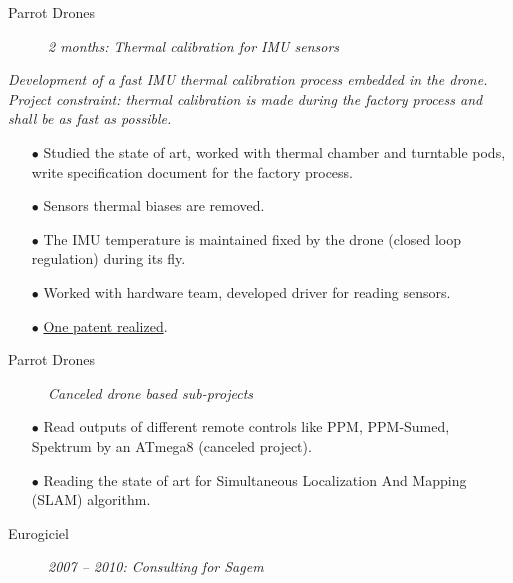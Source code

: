 \documentclass{crcv}
\newcommand{\desc}[4]{
\begin{description}
\item[\textcolor{fortitle}{#1}]\hspace*{\fill}\textit{\textcolor{fortitle}{#2 -- #3: #4}}\\
\end{description}
}
\newcommand{\descC}[3]{
\begin{description}
\item[\textcolor{fortitle}{#1}]\hspace*{\fill}\textit{\textcolor{fortitle}{#2: #3}}\\
\end{description}
}
\newcommand{\descB}[2]{
\begin{description}
\item[\textcolor{fortitle}{#1}]\hspace*{\fill}\textit{\textcolor{fortitle}{#2}}\\
\end{description}
}
\begin{document}
\descC{Parrot Drones}{2 months}{Thermal calibration for IMU sensors}

\textit{Development of a fast IMU thermal calibration process embedded
  in the drone. Project constraint: thermal calibration is made during
  the factory process and shall be as fast as possible.}

\begin{itemize}
\item[$\bullet$] Studied the state of art, worked with thermal chamber
  and turntable pods, write specification document for the factory
  process.
\item[$\bullet$] Sensors thermal biases are removed.
\item[$\bullet$] The IMU temperature is maintained fixed by the drone
  (closed loop regulation) during its fly.
\item[$\bullet$] Worked with hardware team, developed driver for
  reading sensors.
\item[$\bullet$] \href{https://bases-brevets.inpi.fr/en/document-en/FR3037672.html}{One patent realized}.
\end{itemize}

\descB{Parrot Drones}{Canceled drone based sub-projects}
\begin{itemize}
\item[$\bullet$] Read outputs of different remote controls like PPM,
  PPM-Sumed, Spektrum by an ATmega8 (canceled project).
\item[$\bullet$] Reading the state of art for Simultaneous
  Localization And Mapping (SLAM) algorithm.
\end{itemize}

\desc{Eurogiciel}{2007}{2010}{Consulting for Sagem}
\end{document}
